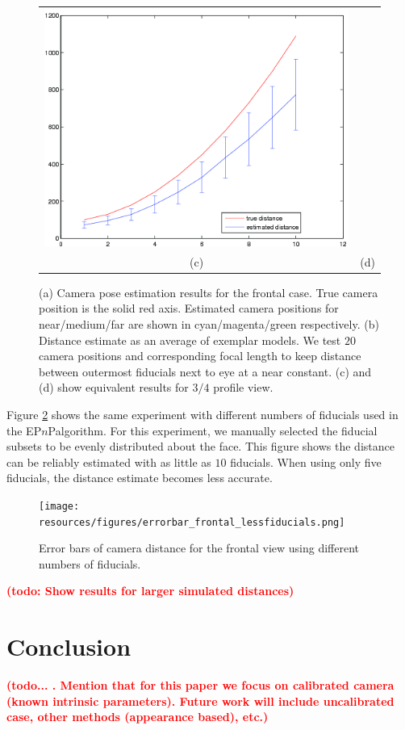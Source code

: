 \documentclass[runningheads]{llncs}
\newcommand {\afbnote} [1] {{\bf \textcolor{red}{(#1)}}}
\newcommand {\EPnP} {EP$n$P}
\begin{document}
\begin{figure}[ht]
\begin{tabular}{cc}
\includegraphics[width=.45\linewidth]{resources/figures/errorbar_3q.png} \\
(c) & (d)
\end{tabular}
\caption{	
(a) Camera pose estimation results for the frontal case.  
True camera position is the solid red axis.  
Estimated camera positions for near/medium/far are shown in cyan/magenta/green respectively.   
(b) Distance estimate as an average of exemplar models.  
We test $20$ camera positions and corresponding focal length to keep distance between outermost fiducials next to eye at a near constant. 
(c) and (d) show equivalent results for $3/4$ profile view.}
\label{fig:results}
\end{figure}

Figure \ref{fig:error_bar_frontal_lessfiducials} shows the same experiment with different numbers of fiducials used in the \EPnP algorithm.  For this experiment, we manually selected the fiducial subsets to be evenly distributed about the face.  This figure shows the distance can be reliably estimated with as little as $10$ fiducials.  When using only five fiducials, the distance estimate becomes less accurate.  

\begin{figure}[h]
\centering
\texttt{[image: resources/figures/errorbar\_frontal\_lessfiducials.png]}
\caption{Error bars of camera distance for the frontal view using different numbers of fiducials.}
\label{fig:error_bar_frontal_lessfiducials}
\end{figure}

\afbnote{todo: Show results for larger simulated distances}

\section{Conclusion}
\afbnote{todo... .  Mention that for this paper we focus on calibrated camera (known intrinsic parameters).  Future work will include uncalibrated case, other methods (appearance based), etc.}



\end{document}
